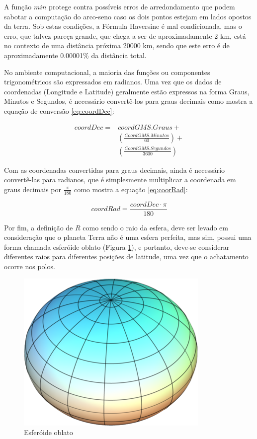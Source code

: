 A função \(min\) protege contra possíveis erros de arredondamento que podem sabotar a computação do arco-seno caso os dois pontos estejam em lados opostos da terra. Sob estas condições, a Fórmula Haversine é mal condicionada, mas o erro, que talvez pareça grande, que chega a ser de aproximadamente 2 km, está no contexto de uma distância próxima 20000 km, sendo que este erro é de aproximadamente 0.00001\% da distância total.

No ambiente computacional, a maioria das funções ou componentes trigonométricos são expressados em radianos. Uma vez que os dados de coordenadas (Longitude e Latitude) geralmente estão expressos na forma Graus, Minutos e Segundos, é necessário convertê-los para graus decimais como mostra a equação de conversão \ref{eq:coordDec}:

\begin{equation}
\label{eq:coordDec}
\begin{matrix}
coordDec = 
& coordGMS.Graus +\\ 
& \left(\frac{CoordGMS.Minutos}{60}\right) +\\ 
& \left(\frac{CoordGMS.Segundos}{3600}\right)
\end{matrix}
\end{equation}

Com as coordenadas convertidas para graus decimais, ainda é necessário convertê-las para radianos, que é simplesmente multiplicar a coordenada em graus decimais por \(\frac{\pi}{180}\) como mostra a equação \ref{eq:coorRad}:

\begin{equation}
\label{eq:coorRad}
coordRad = \frac{coordDec \cdot \pi}{180}
\end{equation}

Por fim, a definição de \(R\) como sendo o raio da esfera, deve ser levado em consideração que o planeta Terra não é uma esfera perfeita, mas sim, possui uma forma chamada esferóide oblato (Figura \ref{fig:OblateSpheroid}), e portanto, deve-se considerar diferentes raios para diferentes posições de latitude, uma vez que o achatamento ocorre nos polos.  

\begin{figure}[h]
	\centering	
	\includegraphics[scale=0.3]{Figuras/OblateSpheroid.PNG}
	\caption{Esferóide oblato}
	\label{fig:OblateSpheroid}
\end{figure}

